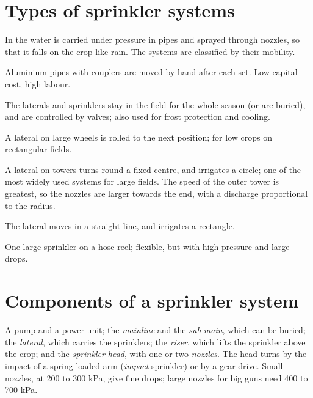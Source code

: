 \section{Types of sprinkler systems}
In  the water is carried under pressure in pipes and sprayed through nozzles, so that it falls on the crop like rain. The systems are classified by their mobility.
\begin{exlist}
\item {} Aluminium pipes with couplers are moved by hand after each set. Low capital cost, high labour.
\item {} The laterals and sprinklers stay in the field for the whole season (or are buried), and are controlled by valves; also used for frost protection and cooling.
\item {} A lateral on large wheels is rolled to the next position; for low crops on rectangular fields.
\item {} A lateral on towers turns round a fixed centre, and irrigates a circle; one of the most widely used systems for large fields. The speed of the outer tower is greatest, so the nozzles are larger towards the end, with a discharge proportional to the radius.
\item {} The lateral moves in a straight line, and irrigates a rectangle.
\item {} One large sprinkler on a hose reel; flexible, but with high pressure and large drops.
\end{exlist}

\section{Components of a sprinkler system}
A pump and a power unit; the \emph{mainline} and the \emph{sub-main}, which can be buried; the \emph{lateral}, which carries the sprinklers; the \emph{riser}, which lifts the sprinkler above the crop; and the \emph{sprinkler head}, with one or two \emph{nozzles}. The head turns by the impact of a spring-loaded arm (\emph{impact} sprinkler) or by a gear drive. Small nozzles, at 200 to 300 kPa, give fine drops; large nozzles for big guns need 400 to 700 kPa.


